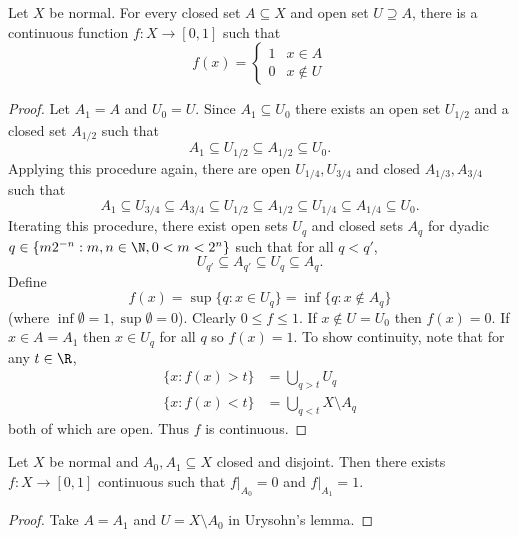 \documentclass[a4paper]{article}
\begin{document}
\begin{proposition}
  Let \(X\) be normal. For every closed set \(A \subseteq X\) and open set \(U \supseteq A\), there is a continuous function \(f: X \to [0, 1]\) such that
  \[
    f(x) =
    \begin{cases}
      1 & x \in A \\
      0 & x \notin U
    \end{cases}
  \]
\end{proposition}

\begin{proof}
  Let \(A_1 = A\) and \(U_0 = U\). Since \(A_1 \subseteq U_0\) there exists an open set \(U_{1/2}\) and a closed set \(A_{1/2}\) such that
  \[
    A_1 \subseteq U_{1/2} \subseteq A_{1/2} \subseteq U_0.
  \]
  Applying this procedure again, there are open \(U_{1/4}, U_{3/4}\) and closed \(A_{1/3}, A_{3/4}\) such that
  \[
    A_1 \subseteq U_{3/4} \subseteq A_{3/4} \subseteq U_{1/2} \subseteq A_{1/2} \subseteq U_{1/4} \subseteq A_{1/4} \subseteq U_0.
  \]
  Iterating this procedure, there exist open sets \(U_q\) and closed sets \(A_q\) for dyadic \(q \in \{m 2^{-n}: m, n \in \N, 0 < m < 2^n\}\) such that for all \(q < q'\),
  \[
    U_{q'} \subseteq A_{q'} \subseteq U_q \subseteq A_q.
  \]
  Define
  \[
    f(x) = \sup \{q: x \in U_q\} = \inf \{q: x \notin A_q\}
  \]
  (where \(\inf \emptyset = 1, \sup \emptyset = 0\)). Clearly \(0 \leq f \leq 1\). If \(x \notin U = U_0\) then \(f(x) = 0\). If \(x \in A = A_1\) then \(x \in U_q\) for all \(q\) so \(f(x) = 1\). To show continuity, note that for any \(t \in \R\),
  \begin{align*}
    \{x: f(x) > t\} &= \bigcup_{q > t} U_q \\
    \{x: f(x) < t\} &= \bigcup_{q < t} X \setminus A_q
  \end{align*}
  both of which are open. Thus \(f\) is continuous.
\end{proof}

\begin{corollary}
  \label{cor:normal space separates closed sets}
  Let \(X\) be normal and \(A_0, A_1 \subseteq X\) closed and disjoint. Then there exists \(f: X \to [0, 1]\) continuous such that \(f|_{A_0} = 0\) and \(f|_{A_1} = 1\).
\end{corollary}

\begin{proof}
  Take \(A = A_1\) and \(U = X \setminus A_0\) in Urysohn's lemma.
\end{proof}
\end{document}
